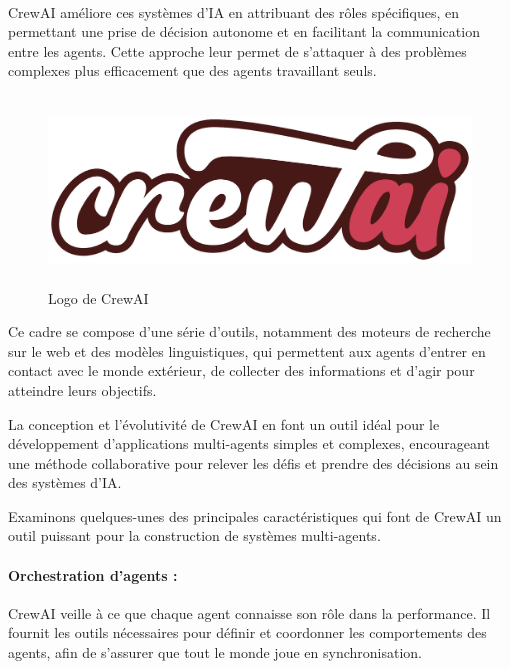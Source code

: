 \paragraph{}
CrewAI améliore ces systèmes d'IA en attribuant des rôles spécifiques, en permettant une prise de décision autonome et en facilitant la communication entre les agents. Cette approche leur permet de s'attaquer à des problèmes complexes plus efficacement que des agents travaillant seuls.

\begin{figure}[h]
    \centering
    \includegraphics[width=\linewidth, height=5cm]{images/crewai.png}
    \caption{Logo de CrewAI} 
\end{figure}
 
\noindent
Ce cadre se compose d'une série d'outils, notamment des moteurs de recherche sur le web et des modèles linguistiques, qui permettent aux agents d'entrer en contact avec le monde extérieur, de collecter des informations et d'agir pour atteindre leurs objectifs.

\medskip

\noindent
La conception et l'évolutivité de CrewAI en font un outil idéal pour le développement d'applications multi-agents simples et complexes, encourageant une méthode collaborative pour relever les défis et prendre des décisions au sein des systèmes d'IA.

\medskip

\noindent
Examinons quelques-unes des principales caractéristiques qui font de CrewAI un outil puissant pour la construction de systèmes multi-agents.

\paragraph{\textbf{Orchestration d'agents :}} CrewAI veille à ce que chaque agent connaisse son rôle dans la performance. Il fournit les outils nécessaires pour définir et coordonner les comportements des agents, afin de s'assurer que tout le monde joue en synchronisation.


